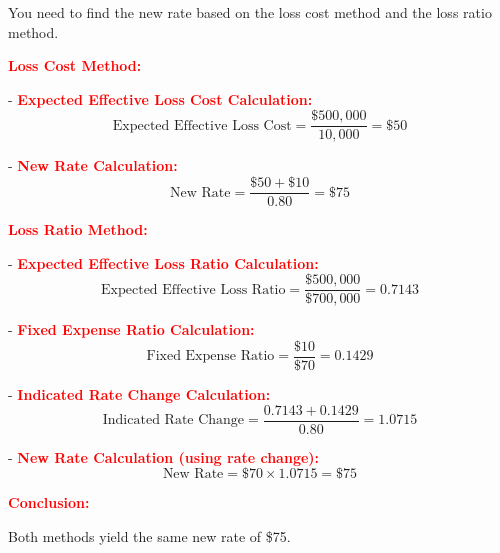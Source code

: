 \documentclass{article}
\begin{document}
\begin{enumerate}
You need to find the new rate based on the loss cost method and the loss ratio method.

\textcolor{red}{\textbf{Loss Cost Method:}}

- \textcolor{red}{\textbf{Expected Effective Loss Cost Calculation:}}
\[ \text{Expected Effective Loss Cost} = \frac{\$500,000}{10,000} = \$50 \]

- \textcolor{red}{\textbf{New Rate Calculation:}}
\[ \text{New Rate} = \frac{\$50 + \$10}{0.80} = \$75 \]

\textcolor{red}{\textbf{Loss Ratio Method:}}

- \textcolor{red}{\textbf{Expected Effective Loss Ratio Calculation:}}
\[ \text{Expected Effective Loss Ratio} = \frac{\$500,000}{\$700,000} = 0.7143 \]

- \textcolor{red}{\textbf{Fixed Expense Ratio Calculation:}}
\[ \text{Fixed Expense Ratio} = \frac{\$10}{\$70} = 0.1429 \]

- \textcolor{red}{\textbf{Indicated Rate Change Calculation:}}
\[ \text{Indicated Rate Change} = \frac{0.7143 + 0.1429}{0.80} = 1.0715 \]

- \textcolor{red}{\textbf{New Rate Calculation (using rate change):}}
\[ \text{New Rate} = \$70 \times 1.0715 = \$75 \]

\textcolor{red}{\textbf{Conclusion:}}

Both methods yield the same new rate of \$75.



   
   \end{enumerate}
\end{document}
